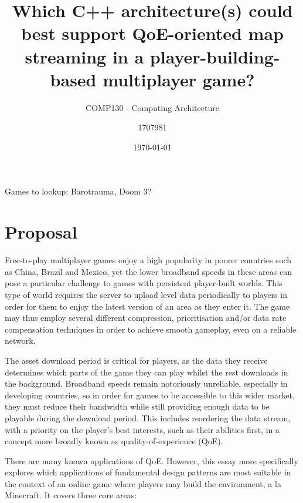 \documentclass{scrartcl}
\title{Which C++ architecture(s) could best support QoE-oriented map streaming in a player-building-based multiplayer game?}
\subtitle{COMP130 - Computing Architecture}
\date{\today}
\author{1707981}
\begin{document}
	\maketitle

Games to lookup: Barotrauma, Doom 3?

\section{Proposal}
Free-to-play multiplayer games enjoy a high popularity in poorer countries such as China, Brazil and Mexico, yet the lower broadband speeds in these areas can pose a particular challenge to games with persistent player-built worlds. This type of world requires the server to upload level data periodically to players in order for them to enjoy the latest version of an area as they enter it. The game may thus employ several different compression, prioritisation and/or data rate compensation techniques in order to achieve smooth gameplay, even on a reliable network.

The asset download period is critical for players, as the data they receive determines which parts of the game they can play whilst the rest downloads in the background. Broadband speeds remain notoriously unreliable, especially in developing countries, so in order for games to be accessible to this wider market, they must reduce their bandwidth while still providing enough data to be playable during the download period. This includes reordering the data stream, with a priority on the player's best interests, such as their abilities first, in a concept more broadly known as quality-of-experience (QoE).

There are many known applications of QoE. However, this essay more specifically explores which applications of fundamental design patterns are most suitable in the context of an online game where players may build the environment, a la Minecraft. It covers three core areas:
\end{document}
